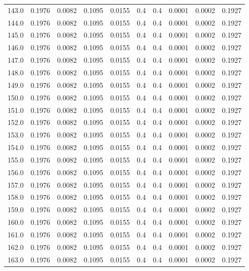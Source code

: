 \begin{longtable}{lrrrrrrrrr}
143.0 & 0.1976 & 0.0082 & 0.1095 & 0.0155 & 0.4 & 0.4 & 0.0001 & 0.0002 & 0.1927 \\
144.0 & 0.1976 & 0.0082 & 0.1095 & 0.0155 & 0.4 & 0.4 & 0.0001 & 0.0002 & 0.1927 \\
145.0 & 0.1976 & 0.0082 & 0.1095 & 0.0155 & 0.4 & 0.4 & 0.0001 & 0.0002 & 0.1927 \\
146.0 & 0.1976 & 0.0082 & 0.1095 & 0.0155 & 0.4 & 0.4 & 0.0001 & 0.0002 & 0.1927 \\
147.0 & 0.1976 & 0.0082 & 0.1095 & 0.0155 & 0.4 & 0.4 & 0.0001 & 0.0002 & 0.1927 \\
148.0 & 0.1976 & 0.0082 & 0.1095 & 0.0155 & 0.4 & 0.4 & 0.0001 & 0.0002 & 0.1927 \\
149.0 & 0.1976 & 0.0082 & 0.1095 & 0.0155 & 0.4 & 0.4 & 0.0001 & 0.0002 & 0.1927 \\
150.0 & 0.1976 & 0.0082 & 0.1095 & 0.0155 & 0.4 & 0.4 & 0.0001 & 0.0002 & 0.1927 \\
151.0 & 0.1976 & 0.0082 & 0.1095 & 0.0155 & 0.4 & 0.4 & 0.0001 & 0.0002 & 0.1927 \\
152.0 & 0.1976 & 0.0082 & 0.1095 & 0.0155 & 0.4 & 0.4 & 0.0001 & 0.0002 & 0.1927 \\
153.0 & 0.1976 & 0.0082 & 0.1095 & 0.0155 & 0.4 & 0.4 & 0.0001 & 0.0002 & 0.1927 \\
154.0 & 0.1976 & 0.0082 & 0.1095 & 0.0155 & 0.4 & 0.4 & 0.0001 & 0.0002 & 0.1927 \\
155.0 & 0.1976 & 0.0082 & 0.1095 & 0.0155 & 0.4 & 0.4 & 0.0001 & 0.0002 & 0.1927 \\
156.0 & 0.1976 & 0.0082 & 0.1095 & 0.0155 & 0.4 & 0.4 & 0.0001 & 0.0002 & 0.1927 \\
157.0 & 0.1976 & 0.0082 & 0.1095 & 0.0155 & 0.4 & 0.4 & 0.0001 & 0.0002 & 0.1927 \\
158.0 & 0.1976 & 0.0082 & 0.1095 & 0.0155 & 0.4 & 0.4 & 0.0001 & 0.0002 & 0.1927 \\
159.0 & 0.1976 & 0.0082 & 0.1095 & 0.0155 & 0.4 & 0.4 & 0.0001 & 0.0002 & 0.1927 \\
160.0 & 0.1976 & 0.0082 & 0.1095 & 0.0155 & 0.4 & 0.4 & 0.0001 & 0.0002 & 0.1927 \\
161.0 & 0.1976 & 0.0082 & 0.1095 & 0.0155 & 0.4 & 0.4 & 0.0001 & 0.0002 & 0.1927 \\
162.0 & 0.1976 & 0.0082 & 0.1095 & 0.0155 & 0.4 & 0.4 & 0.0001 & 0.0002 & 0.1927 \\
163.0 & 0.1976 & 0.0082 & 0.1095 & 0.0155 & 0.4 & 0.4 & 0.0001 & 0.0002 & 0.1927 \\

\end{longtable}
